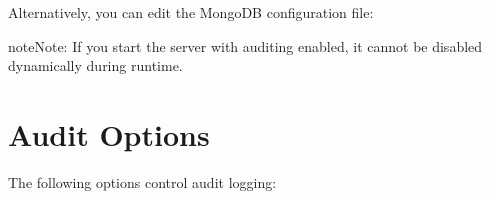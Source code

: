\documentclass[letterpaper,10pt,english]{sphinxmanual}
\begin{document}
\sphinxAtStartPar
Alternatively, you can edit the MongoDB configuration file:

\begin{sphinxVerbatim}[commandchars=\\\{\}]
  
  
\end{sphinxVerbatim}

\begin{sphinxadmonition}{note}{Note:}
\sphinxAtStartPar
If you start the server with auditing enabled,
it cannot be disabled dynamically during runtime.
\end{sphinxadmonition}


\section{Audit Options}
\label{\detokenize{audit-logging:audit-options}}
\sphinxAtStartPar
The following options control audit logging:
\end{document}
